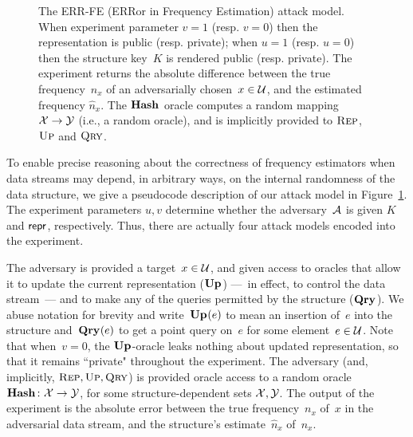 \begin{figure}[tp]
\begin{pchstack}[boxed,center,space=0.5em]
\begin{pcvstack}[space=0.45em]
       \end{pcvstack}
   
       \end{pchstack}
   
   
     \caption[The ERR-FE Attack Model.]{The ERR-FE (ERRor in Frequency Estimation) attack model. When experiment parameter $v=1$ (resp. $v=0$) then the representation is public (resp. private); when $u=1$ (resp. $u=0$) then the structure key~$K$ is rendered public (resp. private). The experiment returns the absolute difference between the true frequency~$n_x$ of an adversarially chosen~$x \in \mathcal{U}$, and the estimated frequency $\hat{n}_x$. The $\textup{\textbf{Hash}}\hspace{0.5pt}$ oracle computes a random mapping $\mathcal{X}\to\mathcal{Y}$ (i.e., a random oracle), and is implicitly provided to $\textnormal{\textsc{Rep}}$, $\textnormal{\textsc{Up}}$ and $\textnormal{\textsc{Qry}}$.}
     \label{fig:err-fe-exp} 
   \end{figure}
   

   To enable precise reasoning about the correctness of frequency estimators when data streams may depend, in arbitrary ways, on the internal randomness of the data structure, we give a pseudocode description of our attack model in Figure~\ref{fig:err-fe-exp}. The experiment parameters $u,v$ determine whether the adversary~$\mathcal{A}$ is given $K$ and $\mathsf{repr}$, respectively.  Thus, there are actually four attack models encoded into the experiment.
  
   The adversary is provided a target~$x\in\mathcal{U}$, and given access to oracles that allow it to update the current representation ($\textup{\textbf{Up}}\hspace{0.5pt}$) ---~in effect, to control the data stream~--- and to make any of the queries permitted by the structure ($\textup{\textbf{Qry}}\hspace{0.5pt}$). We abuse notation for brevity and write~$\textup{\textbf{Up}}\hspace{0.5pt}(e)$ to mean an insertion of~$e$ into the structure and~$\textup{\textbf{Qry}}\hspace{0.5pt}(e)$ to get a point query on~$e$ for some element~$e \in \mathcal{U}$. Note that when~$v=0$, the $\textup{\textbf{Up}}\hspace{0.5pt}$-oracle leaks nothing about updated representation, so that it remains ``private" throughout the experiment.  The adversary (and, implicitly, $\textnormal{\textsc{Rep}}, \textnormal{\textsc{Up}}, \textnormal{\textsc{Qry}}$) is provided oracle access to a random oracle~$\textup{\textbf{Hash}}\hspace{0.5pt} \colon \mathcal{X} \to \mathcal{Y}$, for some structure-dependent sets $\mathcal{X},\mathcal{Y}$.  The output of the experiment is the absolute error between the true frequency~$n_x$ of~$x$ in the adversarial data stream, and the structure's estimate~$\hat{n}_x$ of~$n_x$. 
   

